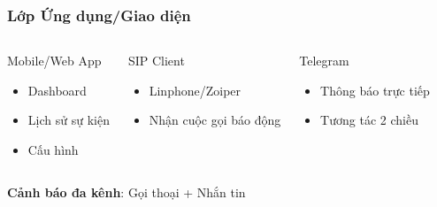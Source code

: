 \begin{frame}
\frametitle{Lớp Ứng dụng/Giao diện}

\begin{columns}
\begin{block}{Mobile/Web App}
\begin{itemize}
\item Dashboard
\item Lịch sử sự kiện
\item Cấu hình
\end{itemize}
\end{block}

\begin{block}{SIP Client}
\begin{itemize}
\item Linphone/Zoiper
\item Nhận cuộc gọi báo động
\end{itemize}
\end{block}

\begin{block}{Telegram}
\begin{itemize}
\item Thông báo trực tiếp
\item Tương tác 2 chiều
\end{itemize}
\end{block}
\end{columns}

\vspace{0.5cm}
\begin{center}
\textbf{Cảnh báo đa kênh}: Gọi thoại + Nhắn tin
\end{center}

\end{frame}


